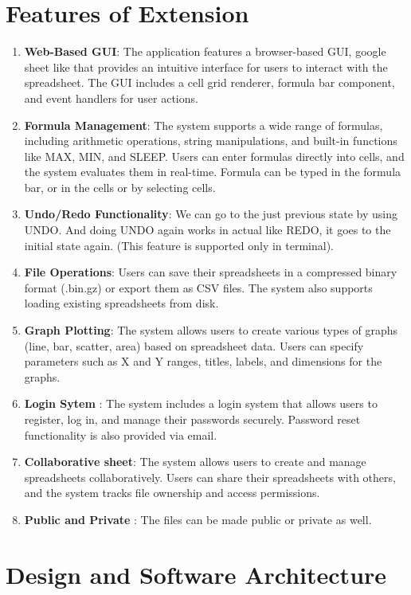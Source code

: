 \documentclass[10pt,a4paper]{article}  %
\begin{document}
\section{Features of Extension}
\begin {enumerate}
\item \textbf{Web-Based GUI}: The application features a browser-based GUI, google sheet like that provides an intuitive interface for users to interact with the spreadsheet. The GUI includes a cell grid renderer, formula bar component, and event handlers for user actions.
    \item \textbf{Formula Management}: The system supports a wide range of formulas, including arithmetic operations, string manipulations, and built-in functions like MAX, MIN, and SLEEP. Users can enter formulas directly into cells, and the system evaluates them in real-time. Formula can be typed in the formula bar, or in the cells or by selecting cells.
    \item \textbf{Undo/Redo Functionality}: We can go to the just previous state by using UNDO. And doing UNDO again works in actual like REDO, it goes to the initial state again. (This feature is supported only in terminal).
    \item \textbf{File Operations}: Users can save their spreadsheets in a compressed binary format (.bin.gz) or export them as CSV files. The system also supports loading existing spreadsheets from disk.
    \item \textbf{Graph Plotting}: The system allows users to create various types of graphs (line, bar, scatter, area) based on spreadsheet data. Users can specify parameters such as X and Y ranges, titles, labels, and dimensions for the graphs.
    \item \textbf{Login Sytem} : The system includes a login system that allows users to register, log in, and manage their passwords securely. Password reset functionality is also provided via email.
    \item \textbf{Collaborative sheet}: The system allows users to create and manage spreadsheets collaboratively. Users can share their spreadsheets with others, and the system tracks file ownership and access permissions.
    \item \textbf{Public and Private} : The files can be made public or private as well.
\end{enumerate}

\section{Design and Software Architecture}
\end{document}
